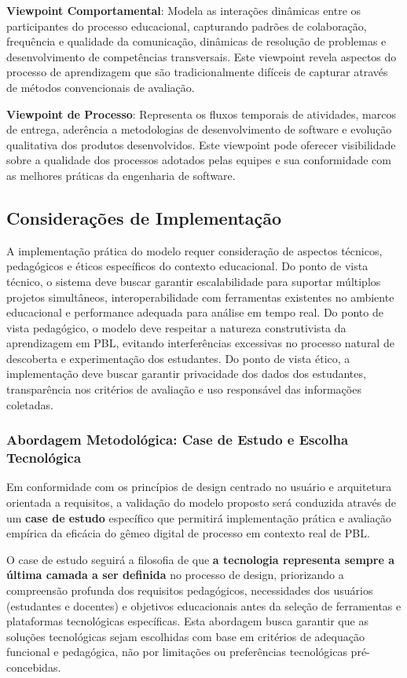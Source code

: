 \documentclass[12pt,a4paper]{article}
\begin{document}
\textbf{Viewpoint Comportamental}: Modela as interações dinâmicas entre os participantes do processo educacional, capturando padrões de colaboração, frequência e qualidade da comunicação, dinâmicas de resolução de problemas e desenvolvimento de competências transversais. Este viewpoint revela aspectos do processo de aprendizagem que são tradicionalmente difíceis de capturar através de métodos convencionais de avaliação.

\textbf{Viewpoint de Processo}: Representa os fluxos temporais de atividades, marcos de entrega, aderência a metodologias de desenvolvimento de software e evolução qualitativa dos produtos desenvolvidos. Este viewpoint pode oferecer visibilidade sobre a qualidade dos processos adotados pelas equipes e sua conformidade com as melhores práticas da engenharia de software.

\subsection{Considerações de Implementação}

A implementação prática do modelo requer consideração de aspectos técnicos, pedagógicos e éticos específicos do contexto educacional. Do ponto de vista técnico, o sistema deve buscar garantir escalabilidade para suportar múltiplos projetos simultâneos, interoperabilidade com ferramentas existentes no ambiente educacional e performance adequada para análise em tempo real. Do ponto de vista pedagógico, o modelo deve respeitar a natureza construtivista da aprendizagem em PBL, evitando interferências excessivas no processo natural de descoberta e experimentação dos estudantes. Do ponto de vista ético, a implementação deve buscar garantir privacidade dos dados dos estudantes, transparência nos critérios de avaliação e uso responsável das informações coletadas.

\subsubsection{Abordagem Metodológica: Case de Estudo e Escolha Tecnológica}

Em conformidade com os princípios de design centrado no usuário e arquitetura orientada a requisitos, a validação do modelo proposto será conduzida através de um \textbf{case de estudo} específico que permitirá implementação prática e avaliação empírica da eficácia do gêmeo digital de processo em contexto real de PBL.

O case de estudo seguirá a filosofia de que \textbf{a tecnologia representa sempre a última camada a ser definida} no processo de design, priorizando a compreensão profunda dos requisitos pedagógicos, necessidades dos usuários (estudantes e docentes) e objetivos educacionais antes da seleção de ferramentas e plataformas tecnológicas específicas. Esta abordagem busca garantir que as soluções tecnológicas sejam escolhidas com base em critérios de adequação funcional e pedagógica, não por limitações ou preferências tecnológicas pré-concebidas.
\end{document}
